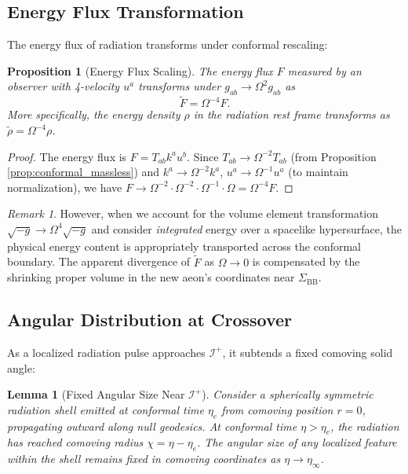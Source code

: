 \documentclass[11pt,a4paper]{article}
\theoremstyle{plain}
\newtheorem{lemma}[theorem]{Lemma}
\newtheorem{proposition}[theorem]{Proposition}
\theoremstyle{definition}
\theoremstyle{remark}
\newtheorem{remark}[theorem]{Remark}
\newcommand{\scriplus}{\mathcal{I}^+}
\newcommand{\sigmabb}{\Sigma_{\mathrm{BB}}}
\begin{document}
\subsection{Energy Flux Transformation}

The energy flux of radiation transforms under conformal rescaling:

\begin{proposition}[Energy Flux Scaling]\label{prop:flux_scaling}
The energy flux $F$ measured by an observer with 4-velocity $u^a$ transforms under $g_{ab} \to \Omega^2 g_{ab}$ as
\begin{equation}\label{eq:flux_transform}
    \tilde{F} = \Omega^{-4} F.
\end{equation}
More specifically, the energy density $\rho$ in the radiation rest frame transforms as $\tilde{\rho} = \Omega^{-4}\rho$.
\end{proposition}

\begin{proof}
The energy flux is $F = T_{ab}k^a u^b$. Since $T_{ab} \to \Omega^{-2}T_{ab}$ (from Proposition \ref{prop:conformal_massless}) and $k^a \to \Omega^{-2}k^a$, $u^a \to \Omega^{-1}u^a$ (to maintain normalization), we have $F \to \Omega^{-2}\cdot\Omega^{-2}\cdot\Omega^{-1}\cdot\Omega = \Omega^{-4}F$.
\end{proof}

\begin{remark}
However, when we account for the volume element transformation $\sqrt{-g} \to \Omega^4 \sqrt{-g}$ and consider \emph{integrated} energy over a spacelike hypersurface, the physical energy content is appropriately transported across the conformal boundary. The apparent divergence of $\tilde{F}$ as $\Omega \to 0$ is compensated by the shrinking proper volume in the new aeon's coordinates near $\sigmabb$.
\end{remark}

\subsection{Angular Distribution at Crossover}

As a localized radiation pulse approaches $\scriplus$, it subtends a fixed comoving solid angle:

\begin{lemma}[Fixed Angular Size Near $\scriplus$]\label{lem:angular_size}
Consider a spherically symmetric radiation shell emitted at conformal time $\eta_e$ from comoving position $r = 0$, propagating outward along null geodesics. At conformal time $\eta > \eta_e$, the radiation has reached comoving radius $\chi = \eta - \eta_e$. The angular size of any localized feature within the shell remains fixed in comoving coordinates as $\eta \to \eta_\infty$.
\end{lemma}
\end{document}
